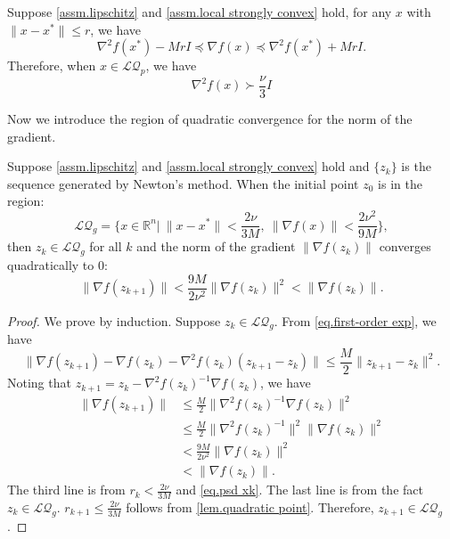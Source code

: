 \documentclass{article}
\begin{document}
\begin{lemma}
    Suppose \autoref{assm.lipschitz} and \autoref{assm.local strongly convex} hold, for any $x$ with $\|x-x^*\| \leq r$, we have
    \begin{equation}
        \label{eq.psd region}
        \nabla^2 f(x^*)-MrI\preceq \nabla f(x) \preceq \nabla^2 f(x^*)+MrI.
    \end{equation}
    Therefore, when $x\in \mathcal{LQ}_p$, we have
    \begin{equation}
        \label{eq.psd xk}
        \nabla^2 f(x) \succ \frac{\nu}{3}I
    \end{equation}
\end{lemma}
Now we introduce the region of quadratic convergence for the norm of the gradient.
\begin{lemma}
    \label{lem.quadratic gradient}
    Suppose \autoref{assm.lipschitz} and \autoref{assm.local strongly convex} hold and $\{z_k\}$ is the sequence generated by Newton's method. When the initial point $z_0$ is in the region:
    \begin{equation}
        \label{eq.local quadratic region gradient}
        \mathcal{LQ}_g = \{x\in\mathbb{R}^n| \ \|x-x^*\| < \frac{2\nu}{3M}, \ \|\nabla f(x)\|< \frac{2\nu^2}{9M}\}, 
    \end{equation}
    then $z_k \in \mathcal{LQ}_g$ for all $k$ and the norm of the gradient $\|\nabla f(z_k)\|$ converges quadratically to $0$:
    \begin{equation}
        \label{eq.quadratic convergence gradient}
        \|\nabla f(z_{k+1})\| < \frac{9M}{2\nu^2}\|\nabla f(z_k)\|^2<\|\nabla f(z_k)\|.
    \end{equation}
\end{lemma}
\begin{proof}
    We prove by induction. Suppose $z_k\in \mathcal{LQ}_g$. From \eqref{eq.first-order exp}, we have
    \begin{equation*}
            \|\nabla f(z_{k+1}) -\nabla f(z_k)-\nabla^2 f(z_k)(z_{k+1}-z_k)\| \leq \frac{M}{2}\|z_{k+1}-z_k\|^2.
    \end{equation*}
    Noting that $z_{k+1} = z_k-\nabla^2 f(z_k)^{-1}\nabla f(z_k)$, we have
    \begin{equation*}
        \begin{aligned}
            \|\nabla f(z_{k+1})\| &\leq \frac{M}{2}\|\nabla^2 f(z_k)^{-1} \nabla f(z_k)\|^2\\
            & \leq \frac{M}{2}\|\nabla^2 f(z_k)^{-1}\|^2\| \nabla f(z_k)\|^2\\
            &< \frac{9M}{2\nu^2}\|\nabla f(z_k)\|^2\\
            &< \|\nabla f(z_k)\|.
        \end{aligned}
    \end{equation*}
    The third line is from $r_k< \frac{2\nu}{3M}$ and \eqref{eq.psd xk}. The last line is from the fact $z_k\in \mathcal{LQ}_g$. $r_{k+1} \leq \frac{2\nu}{3M}$ follows from \autoref{lem.quadratic point}. Therefore, $z_{k+1}\in \mathcal{LQ}_g$.
\end{proof}
\end{document}

